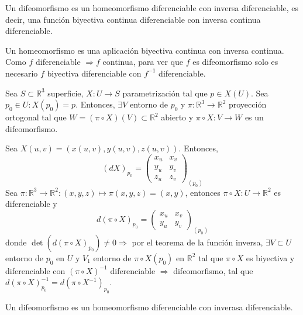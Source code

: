 \begin{defn}[Difeomorfismo]
  Un difeomorfismo es un homeomorfismo diferenciable con inversa diferenciable, es decir, una función biyectiva continua diferenciable con inversa continua diferenciable.
\end{defn}

\begin{obs}
  Un homeomorfismo es una aplicación biyectiva continua con inversa continua. Como $f$ diferenciable $\Rightarrow f$ continua, para ver que $f$ es difeomorfismo solo es necesario $f$ biyectiva diferenciable con $f^{-1}$ diferenciable.
\end{obs}

\begin{prop}[]
  Sea $S \subset \mathbb{R}^{3}$ superficie, $X: U \to S$ parametrización tal que $p \in X(U)$. Sea $p_{0} \in U: X(p_{0}) = p$. Entonces, $\exists V$ entorno de $p_{0}$ y $\pi: \mathbb{R}^{3} \to \mathbb{R}^{2}$ proyección ortogonal tal que $W = (\pi \circ X)(V) \subset \mathbb{R}^{2}$ abierto y $\pi \circ X: V \to W$ es un difeomorfismo.
\end{prop}

\begin{dem}
  Sea $X(u, v) = (x(u, v), y(u, v), z(u, v))$. Entonces, 
  \[ 
    (d X)_{p_{0}} = 
    \begin{pmatrix}
       x_{u} & x_{v} \\
       y_{u} & y_{v} \\
       z_{u} & z_{v} 
     \end{pmatrix}_{(p_{0})}
  \] 
  Sea $\pi : \mathbb{R}^{3} \to \mathbb{R}^{2} : (x, y, z) \mapsto \pi(x, y, z) = (x, y)$, entonces $\pi \circ X : U \to \mathbb{R}^{2}$ es diferenciable y
  \[ 
    d(\pi \circ X)_{p_{0}} = 
    \begin{pmatrix}
       x_{u} & x_{v} \\
       y_{u} & y_{v}
     \end{pmatrix}_{(p_{0})}
  \] 
  donde $\det(d(\pi \circ X)_{p_{0}}) \neq 0 \Rightarrow$ por el teorema de la función inversa, $\exists V \subset U$ entorno de $p_{0}$ en $U$ y $V_{1}$ entorno de $\pi \circ X (p_{0})$ en $\mathbb{R}^{2}$ tal que $\pi \circ X$ es biyectiva y diferenciable con $(\pi \circ X)^{-1}$ diferenciable $\Rightarrow$ difeomorfismo, tal que $d(\pi \circ X)_{p_{0}}^{-1} = d(\pi \circ X ^{-1})_{p_{0}}$.
\end{dem}

\begin{obs}
  Un difeomorfismo es un homeomorfismo diferenciable con inverasa diferenciable.
\end{obs}

